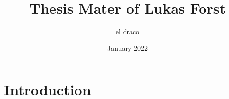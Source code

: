 \documentclass{article}
\title{Thesis Mater of Lukas Forst}
\author{el draco}
\date{January 2022}
\begin{document}
\maketitle

\section{Introduction}


\end{document}
